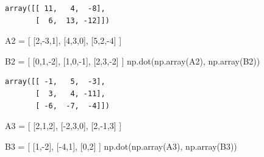 \documentclass[
  letterpaper,
  DIV=11,
  numbers=noendperiod]{scrartcl}
\newenvironment{Shaded}{\begin{snugshade}}{\end{snugshade}}
\newcommand{\DecValTok}[1]{\textcolor[rgb]{0.68,0.00,0.00}{#1}}
\newcommand{\NormalTok}[1]{\textcolor[rgb]{0.00,0.23,0.31}{#1}}
\newcommand{\OperatorTok}[1]{\textcolor[rgb]{0.37,0.37,0.37}{#1}}
\begin{document}
\begin{verbatim}
array([[ 11,   4,  -8],
       [  6,  13, -12]])
\end{verbatim}

\begin{Shaded}
\begin{Highlighting}[]
\NormalTok{A2 }\OperatorTok{=}\NormalTok{ [}
\NormalTok{    [}\DecValTok{2}\NormalTok{,}\OperatorTok{{-}}\DecValTok{3}\NormalTok{,}\DecValTok{1}\NormalTok{],}
\NormalTok{    [}\DecValTok{4}\NormalTok{,}\DecValTok{3}\NormalTok{,}\DecValTok{0}\NormalTok{],}
\NormalTok{    [}\DecValTok{5}\NormalTok{,}\DecValTok{2}\NormalTok{,}\OperatorTok{{-}}\DecValTok{4}\NormalTok{]}
\NormalTok{]}

\NormalTok{B2 }\OperatorTok{=}\NormalTok{ [}
\NormalTok{    [}\DecValTok{0}\NormalTok{,}\DecValTok{1}\NormalTok{,}\OperatorTok{{-}}\DecValTok{2}\NormalTok{],}
\NormalTok{    [}\DecValTok{1}\NormalTok{,}\DecValTok{0}\NormalTok{,}\OperatorTok{{-}}\DecValTok{1}\NormalTok{],}
\NormalTok{    [}\DecValTok{2}\NormalTok{,}\DecValTok{3}\NormalTok{,}\OperatorTok{{-}}\DecValTok{2}\NormalTok{]}
\NormalTok{]}
\NormalTok{np.dot(np.array(A2), np.array(B2))}
\end{Highlighting}
\end{Shaded}

\begin{verbatim}
array([[ -1,   5,  -3],
       [  3,   4, -11],
       [ -6,  -7,  -4]])
\end{verbatim}

\begin{Shaded}
\begin{Highlighting}[]
\NormalTok{A3 }\OperatorTok{=}\NormalTok{ [}
\NormalTok{    [}\DecValTok{2}\NormalTok{,}\DecValTok{1}\NormalTok{,}\DecValTok{2}\NormalTok{],}
\NormalTok{    [}\OperatorTok{{-}}\DecValTok{2}\NormalTok{,}\DecValTok{3}\NormalTok{,}\DecValTok{0}\NormalTok{],}
\NormalTok{    [}\DecValTok{2}\NormalTok{,}\OperatorTok{{-}}\DecValTok{1}\NormalTok{,}\DecValTok{3}\NormalTok{]}
\NormalTok{]}

\NormalTok{B3 }\OperatorTok{=}\NormalTok{ [}
\NormalTok{    [}\DecValTok{1}\NormalTok{,}\OperatorTok{{-}}\DecValTok{2}\NormalTok{],}
\NormalTok{    [}\OperatorTok{{-}}\DecValTok{4}\NormalTok{,}\DecValTok{1}\NormalTok{],}
\NormalTok{    [}\DecValTok{0}\NormalTok{,}\DecValTok{2}\NormalTok{]}
\NormalTok{]}
\NormalTok{np.dot(np.array(A3), np.array(B3))}
\end{Highlighting}
\end{Shaded}
\end{document}

